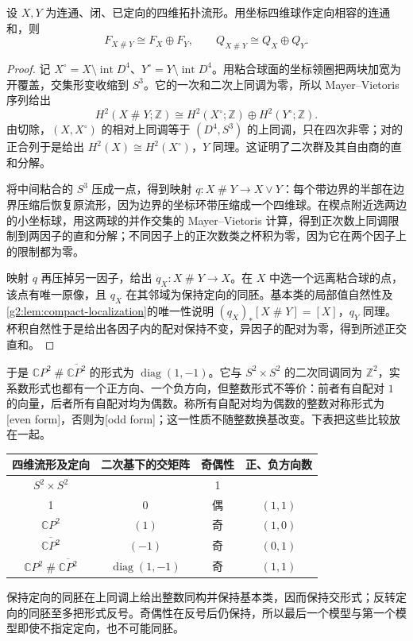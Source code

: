\begin{proposition}\label{g2:prop:connected-sum-intersection}
	设 \(X,Y\) 为连通、闭、已定向的四维拓扑流形。用坐标四维球作定向相容的连通和，则
	\[
		F_{X\mathbin{\#}Y}\cong F_X\oplus F_Y,
		\qquad Q_{X\mathbin{\#}Y}\cong Q_X\oplus Q_Y.
	\]
\end{proposition}
\begin{proof}
	记 \(X^\circ=X\setminus\operatorname{int}D^4\)、\(Y^\circ=Y\setminus\operatorname{int}D^4\)。用粘合球面的坐标领圈把两块加宽为开覆盖，交集形变收缩到 \(S^3\)。它的一次和二次上同调为零，所以 Mayer--Vietoris 序列给出
	\[
		H^2(X\mathbin{\#}Y;\mathbb Z)\cong H^2(X^\circ;\mathbb Z)\oplus H^2(Y^\circ;\mathbb Z).
	\]
	由切除，\((X,X^\circ)\) 的相对上同调等于 \((D^4,S^3)\) 的上同调，只在四次非零；对的正合列于是给出 \(H^2(X)\cong H^2(X^\circ)\)，\(Y\) 同理。这证明了二次群及其自由商的直和分解。

	将中间粘合的 \(S^3\) 压成一点，得到映射 \(q:X\mathbin{\#}Y\to X\vee Y\)：每个带边界的半部在边界压缩后恢复原流形，因为边界的坐标环带压缩成一个四维球。在楔点附近选两边的小坐标球，用这两球的并作交集的 Mayer--Vietoris 计算，得到正次数上同调限制到两因子的直和分解；不同因子上的正次数类之杯积为零，因为它在两个因子上的限制都为零。

	映射 \(q\) 再压掉另一因子，给出 \(q_X:X\mathbin{\#}Y\to X\)。在 \(X\) 中选一个远离粘合球的点，该点有唯一原像，且 \(q_X\) 在其邻域为保持定向的同胚。基本类的局部值自然性及\cref{g2:lem:compact-localization}的唯一性说明 \((q_X)_*[X\mathbin{\#}Y]=[X]\)，\(q_Y\) 同理。杯积自然性于是给出各因子内的配对保持不变，异因子的配对为零，得到所述正交直和。
\end{proof}

于是 \(\mathbb CP^2\mathbin{\#}\overline{\mathbb CP^2}\) 的形式为 \(\operatorname{diag}(1,-1)\)。它与 \(S^2\times S^2\) 的二次同调同为 \(\mathbb Z^2\)，实系数形式也都有一个正方向、一个负方向，但整数形式不等价：前者有自配对 \(1\) 的向量，后者所有自配对均为偶数。称所有自配对均为偶数的整数对称形式为[even form]，否则为[odd form]；这一性质不随整数换基改变。下表把这些比较放在一起。
\begin{center}
	\begin{tabular}{c|c|c|c}
		四维流形及定向 & 二次基下的交矩阵 & 奇偶性 & 正、负方向数\\\hline
		\(S^2\times S^2\) & \(\left(\begin{smallmatrix}0&1\\1&0\end{smallmatrix}\right)\) & 偶 & \((1,1)\)\\
		\(\mathbb CP^2\) & \((1)\) & 奇 & \((1,0)\)\\
		\(\overline{\mathbb CP^2}\) & \((-1)\) & 奇 & \((0,1)\)\\
		\(\mathbb CP^2\mathbin{\#}\overline{\mathbb CP^2}\) & \(\operatorname{diag}(1,-1)\) & 奇 & \((1,1)\)
	\end{tabular}
\end{center}
保持定向的同胚在上同调上给出整数同构并保持基本类，因而保持交形式；反转定向的同胚至多把形式反号。奇偶性在反号后仍保持，所以最后一个模型与第一个模型即使不指定定向，也不可能同胚。


